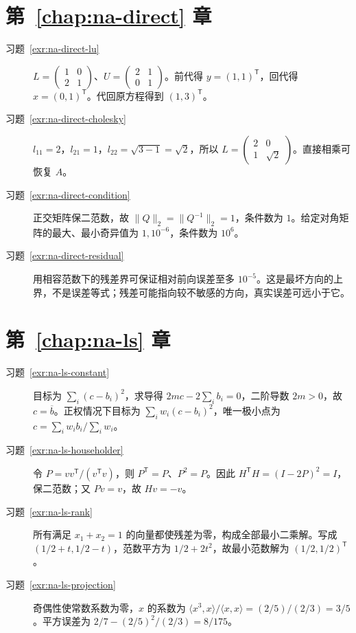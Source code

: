 \section{第~\ref{chap:na-direct} 章}
\begin{description}
\item[习题~\ref{exr:na-direct-lu}] $L=\begin{pmatrix}1&0\\2&1\end{pmatrix}$、$U=\begin{pmatrix}2&1\\0&1\end{pmatrix}$。前代得 $y=(1,1)^{\mathsf T}$，回代得 $x=(0,1)^{\mathsf T}$。代回原方程得到 $(1,3)^{\mathsf T}$。
\item[习题~\ref{exr:na-direct-cholesky}] $l_{11}=2$，$l_{21}=1$，$l_{22}=\sqrt{3-1}=\sqrt2$，所以 $L=\begin{pmatrix}2&0\\1&\sqrt2\end{pmatrix}$。直接相乘可恢复 $A$。
\item[习题~\ref{exr:na-direct-condition}] 正交矩阵保二范数，故 $\|Q\|_2=\|Q^{-1}\|_2=1$，条件数为 $1$。给定对角矩阵的最大、最小奇异值为 $1,10^{-6}$，条件数为 $10^6$。
\item[习题~\ref{exr:na-direct-residual}] 用相容范数下的残差界可保证相对前向误差至多 $10^{-5}$。这是最坏方向的上界，不是误差等式；残差可能指向较不敏感的方向，真实误差可远小于它。
\end{description}

\section{第~\ref{chap:na-ls} 章}
\begin{description}
\item[习题~\ref{exr:na-ls-constant}] 目标为 $\sum_i(c-b_i)^2$，求导得 $2mc-2\sum_i b_i=0$，二阶导数 $2m>0$，故 $c=\overline b$。正权情况下目标为 $\sum_iw_i(c-b_i)^2$，唯一极小点为 $c=\sum_iw_ib_i/\sum_iw_i$。
\item[习题~\ref{exr:na-ls-householder}] 令 $P=vv^{\mathsf T}/(v^{\mathsf T}v)$，则 $P^{\mathsf T}=P$、$P^2=P$。因此 $H^{\mathsf T}H=(I-2P)^2=I$，保二范数；又 $Pv=v$，故 $Hv=-v$。
\item[习题~\ref{exr:na-ls-rank}] 所有满足 $x_1+x_2=1$ 的向量都使残差为零，构成全部最小二乘解。写成 $(1/2+t,1/2-t)$，范数平方为 $1/2+2t^2$，故最小范数解为 $(1/2,1/2)^{\mathsf T}$。
\item[习题~\ref{exr:na-ls-projection}] 奇偶性使常数系数为零，$x$ 的系数为 $\langle x^3,x\rangle/\langle x,x\rangle=(2/5)/(2/3)=3/5$。平方误差为 $2/7-(2/5)^2/(2/3)=8/175$。
\end{description}


